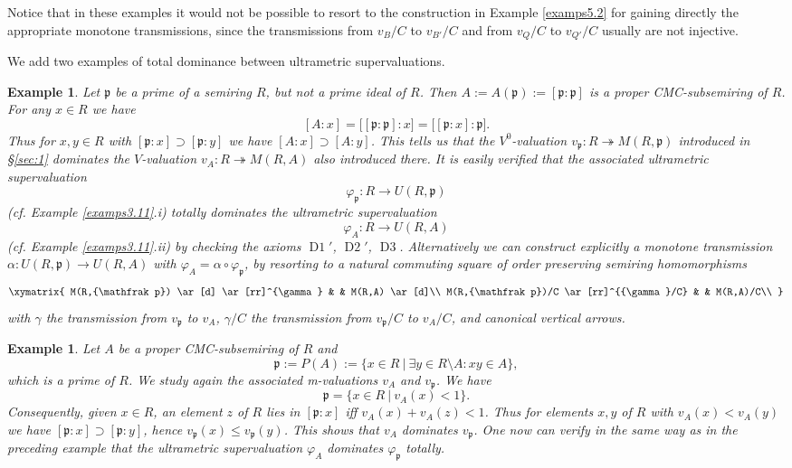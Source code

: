 \documentclass [12pt,a4paper,reqno]{amsart}
\newtheorem{example}[thm]{Example}
\begin{document}
Notice that in these examples it would not be possible to resort
to the construction in Example \ref{examps5.2} for gaining
directly the appropriate monotone transmissions, since the
transmissions from $v_{B}/C$ to $v_{B'}/C$ and from $v_Q / C$ to
$v_{Q'} / C$ usually are not injective.

We add two examples of total dominance between ultrametric
supervaluations.
\begin{example}\label{examps5.10} Let ${\mathfrak p}$ be a prime of a semiring
$R$, but not a prime ideal of $R$. Then $A:= A({\mathfrak p}) := [{\mathfrak p}:
{\mathfrak p}]$ is a proper CMC-subsemiring of $R$. For any $x \in R$ we
have
$$ [A: x] = \big[ [{\mathfrak p}:{\mathfrak p}]: x \big] = \big[ [{\mathfrak p}:x]: {\mathfrak p} \big].$$
Thus for $x,y \in R$ with $[{\mathfrak p}:x] \supset [{\mathfrak p}:y]$ we have
$[A:x] \supset [A:y]$. This tells us that the {$V^0$}-valuation
$v_{\mathfrak p}: R {\twoheadrightarrow} M(R,{\mathfrak p})$ introduced in \S\ref{sec:1} dominates
the $V$-valuation $v_A: R {\twoheadrightarrow} M(R,A)$ also introduced there. It
is easily verified that the associated ultrametric supervaluation
$$ {\varphi}_{\mathfrak p} : R \to U(R, {\mathfrak p})$$  (cf. Example
\ref{examps3.11}.i) totally dominates the ultrametric
supervaluation
$$ {\varphi}_A : R \to U(R, A)$$ (cf. Example
\ref{examps3.11}.ii) by checking  the axioms ${\operatorname{D{1}}}'$, ${\operatorname{D{2}}}'$,
${\operatorname{D{3}}}$. Alternatively we can construct explicitly a monotone
transmission ${\alpha}: U(R,{\mathfrak p}) \to U(R,A)$  with ${\varphi}_A = {\alpha} \circ
{\varphi}_{\mathfrak p}$, by resorting  to a natural commuting  square of order
preserving semiring homomorphisms
 $$\xymatrix{
     M(R,{\mathfrak p})    \ar[d]  \ar[rr]^{\gamma}  & &  M(R,A) \ar[d]\\
     M(R,{\mathfrak p})/C      \ar[rr]^{{\gamma}/C}  & &  M(R,A)/C\\
  }$$
with ${\gamma}$ the transmission from $v_{\mathfrak p}$ to $v_A$,   ${\gamma}/C$ the
transmission from $v_{\mathfrak p}/C$ to $v_A/C$, and canonical vertical
arrows.
\end{example}

\begin{example}\label{examps5.11} Let $A$ be a proper CMC-subsemiring
of $R$ and $${\mathfrak p}:= P(A) := \{ x\in R {\ {|} \ } \exists y \in R {\setminus} A
: xy \in A\},$$ which is a prime of $R$. We study again the
associated {m}-valuations $v_A$ and $v_{\mathfrak p}$. We have
$${\mathfrak p}=  \{ x\in R {\ {|} \ } v_A (x) < 1 \}.$$ Consequently, given  $x\in R
$, an element $z$ of $R$ lies in $[{\mathfrak p}: x]$ iff $v_A(x) + v_A(z)
< 1$. Thus for elements $x,y$ of $R$ with $v_A(x) < v_A(y)$ we
have $[{\mathfrak p} : x ] \supset [{\mathfrak p}:y]$, hence $v_{\mathfrak p}(x) \leq
v_{\mathfrak p}(y)$. This shows that $v_A$ dominates $v_{\mathfrak p}$. One now can
verify in the same way as in the preceding example that the
ultrametric supervaluation ${\varphi}_A$ dominates ${\varphi}_{\mathfrak p}$ totally.
\end{example}
\end{document}
